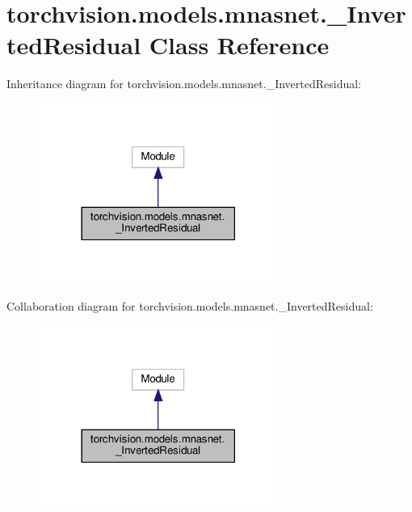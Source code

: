 \hypertarget{classtorchvision_1_1models_1_1mnasnet_1_1__InvertedResidual}{}\section{torchvision.\+models.\+mnasnet.\+\_\+\+Inverted\+Residual Class Reference}
\label{classtorchvision_1_1models_1_1mnasnet_1_1__InvertedResidual}


Inheritance diagram for torchvision.\+models.\+mnasnet.\+\_\+\+Inverted\+Residual\+:
\nopagebreak
\begin{figure}[H]
\begin{center}
\leavevmode
\includegraphics[width=222pt]{classtorchvision_1_1models_1_1mnasnet_1_1__InvertedResidual__inherit__graph}
\end{center}
\end{figure}


Collaboration diagram for torchvision.\+models.\+mnasnet.\+\_\+\+Inverted\+Residual\+:
\nopagebreak
\begin{figure}[H]
\begin{center}
\leavevmode
\includegraphics[width=222pt]{classtorchvision_1_1models_1_1mnasnet_1_1__InvertedResidual__coll__graph}
\end{center}
\end{figure}
